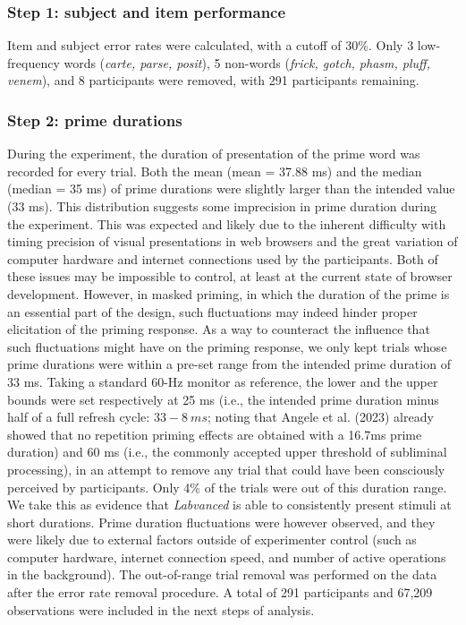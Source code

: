 \documentclass[
]{interact}
\begin{document}
\subsubsection{Step 1: subject and item
performance}\label{sec-exp1-analysis-performance}

Item and subject error rates were calculated, with a cutoff of 30\%.
Only 3 low-frequency words (\emph{carte, parse, posit}), 5 non-words
(\emph{frick, gotch, phasm, pluff, venem}), and 8 participants were
removed, with 291 participants remaining.

\subsubsection{Step 2: prime
durations}\label{sec-exp1-analysis-primeTime}

During the experiment, the duration of presentation of the prime word
was recorded for every trial. Both the mean (mean = 37.88 ms) and the
median (median = 35 ms) of prime durations were slightly larger than the
intended value (33 ms). This distribution suggests some imprecision in
prime duration during the experiment. This was expected and likely due
to the inherent difficulty with timing precision of visual presentations
in web browsers and the great variation of computer hardware and
internet connections used by the participants. Both of these issues may
be impossible to control, at least at the current state of browser
development. However, in masked priming, in which the duration of the
prime is an essential part of the design, such fluctuations may indeed
hinder proper elicitation of the priming response. As a way to
counteract the influence that such fluctuations might have on the
priming response, we only kept trials whose prime durations were within
a pre-set range from the intended prime duration of 33 ms. Taking a
standard 60-Hz monitor as reference, the lower and the upper bounds were
set respectively at 25 ms (i.e., the intended prime duration minus half
of a full refresh cycle: \(33-8~ ms\); noting that Angele et al. (2023)
already showed that no repetition priming effects are obtained with a
16.7ms prime duration) and 60 ms (i.e., the commonly accepted upper
threshold of subliminal processing), in an attempt to remove any trial
that could have been consciously perceived by participants. Only 4\% of
the trials were out of this duration range. We take this as evidence
that \emph{Labvanced} is able to consistently present stimuli at short
durations. Prime duration fluctuations were however observed, and they
were likely due to external factors outside of experimenter control
(such as computer hardware, internet connection speed, and number of
active operations in the background). The out-of-range trial removal was
performed on the data after the error rate removal procedure. A total of
291 participants and 67,209 observations were included in the next steps
of analysis.
\end{document}
